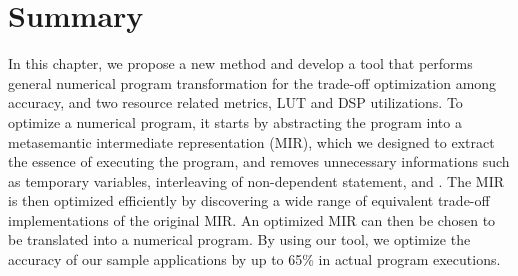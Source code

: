 \section{Summary}
\label{po:sec:conclusion}

In this chapter, we propose a new method and develop a tool that performs general
numerical program transformation for the trade-off optimization among accuracy,
and two resource related metrics, LUT and DSP utilizations.  To optimize a
numerical program, it starts by abstracting the program into a metasemantic
intermediate representation (MIR), which we designed to extract the essence of
executing the program, and removes unnecessary informations such as temporary
variables, interleaving of non-dependent statement, and \etc.  The MIR is then
optimized efficiently by discovering a wide range of equivalent trade-off
implementations of the original MIR\@.  An optimized MIR can then be chosen to
be translated into a numerical program.  By using our tool, we optimize the
accuracy of our sample applications by up to 65\% in actual program executions.

